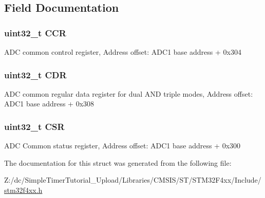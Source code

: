 \subsection{Field Documentation}
\hypertarget{struct_a_d_c___common___type_def_a5e1322e27c40bf91d172f9673f205c97}{
\subsubsection[{C\-C\-R}]{ uint32\-\_\-t C\-C\-R}}\label{struct_a_d_c___common___type_def_a5e1322e27c40bf91d172f9673f205c97}
A\-D\-C common control register, Address offset\-: A\-D\-C1 base address + 0x304 \hypertarget{struct_a_d_c___common___type_def_a760f86a1a18dffffda54fc15a977979f}{
\subsubsection[{C\-D\-R}]{ uint32\-\_\-t C\-D\-R}}\label{struct_a_d_c___common___type_def_a760f86a1a18dffffda54fc15a977979f}
A\-D\-C common regular data register for dual A\-N\-D triple modes, Address offset\-: A\-D\-C1 base address + 0x308 \hypertarget{struct_a_d_c___common___type_def_a876dd0a8546697065f406b7543e27af2}{
\subsubsection[{C\-S\-R}]{ uint32\-\_\-t C\-S\-R}}\label{struct_a_d_c___common___type_def_a876dd0a8546697065f406b7543e27af2}
A\-D\-C Common status register, Address offset\-: A\-D\-C1 base address + 0x300 

The documentation for this struct was generated from the following file\-:\begin{DoxyCompactItemize}
\item 
Z\-:/dc/\-Simple\-Timer\-Tutorial\-\_\-\-Upload/\-Libraries/\-C\-M\-S\-I\-S/\-S\-T/\-S\-T\-M32\-F4xx/\-Include/\hyperlink{stm32f4xx_8h}{stm32f4xx.\-h}\end{DoxyCompactItemize}

